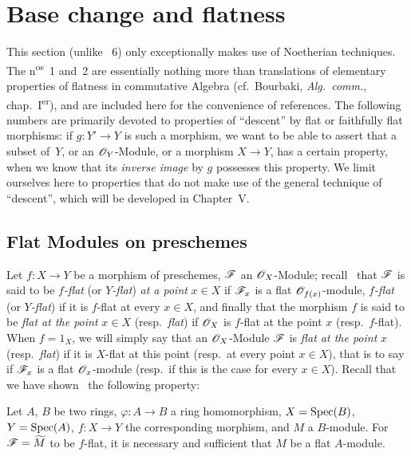 \section{Base change and flatness}
\label{section:IV.2}


This section (unlike \textsection~6) only exceptionally makes use of Noetherian techniques.
The n\textsuperscript{os}~1 and~2 are essentially nothing more than translations of elementary properties of flatness in commutative Algebra (cf.~Bourbaki, \emph{Alg.~comm.}, chap.~I\textsuperscript{er}), and are included here for the convenience of references.
The following numbers are primarily devoted to properties of ``descent'' by flat or faithfully flat morphisms: if $g:Y'\to Y$ is such a morphism, we want to be able to assert that a subset of~$Y$, or an $\mathscr{O}_Y$-Module, or a morphism $X\to Y$, has a certain property, when we know that its \emph{inverse image} by $g$ possesses this property.
We limit ourselves here to properties that do not make use of the general technique of ``descent'', which will be developed in Chapter~V.

\subsection{Flat Modules on preschemes}
\label{subsection:IV.2.1}

\begin{env}[2.1.1]
\label{IV.2.1.1}
Let $f:X\to Y$ be a morphism of preschemes, $\mathscr{F}$ an $\mathscr{O}_X$-Module;
recall~ that $\mathscr{F}$ is said to be \emph{$f$-flat} (or \emph{$Y$-flat}) \emph{at a point} $x\in X$ if $\mathscr{F}_x$ is a flat $\mathscr{O}_{f(x)}$-module, \emph{$f$-flat} (or \emph{$Y$-flat}) if it is $f$-flat at every $x\in X$, and finally that the morphism $f$ is said to be \emph{flat at the point} $x\in X$ (resp.\ \emph{flat}) if $\mathscr{O}_X$ is $f$-flat at the point $x$ (resp.\ $f$-flat).
When $f=1_X$, we will simply say that an $\mathscr{O}_X$-Module $\mathscr{F}$ is \emph{flat at the point} $x$ (resp.\ \emph{flat}) if it is $X$-flat at this point (resp.\ at every point $x\in X$), that is to say if $\mathscr{F}_x$ is a flat $\mathscr{O}_x$-module (resp.\ if this is the case for every $x\in X$).
Recall that we have shown~ the following property:
\end{env}

\begin{proposition}[2.1.2]
\label{IV.2.1.2}
Let $A$, $B$ be two rings, $\varphi:A\to B$ a ring homomorphism, $X=\operatorname{Spec}(B)$, $Y=\operatorname{Spec}(A)$, $f:X\to Y$ the corresponding morphism, and $M$ a $B$-module.
For $\mathscr{F}=\widetilde{M}$ to be $f$-flat, it is necessary and sufficient that $M$ be a flat $A$-module.
\end{proposition}

